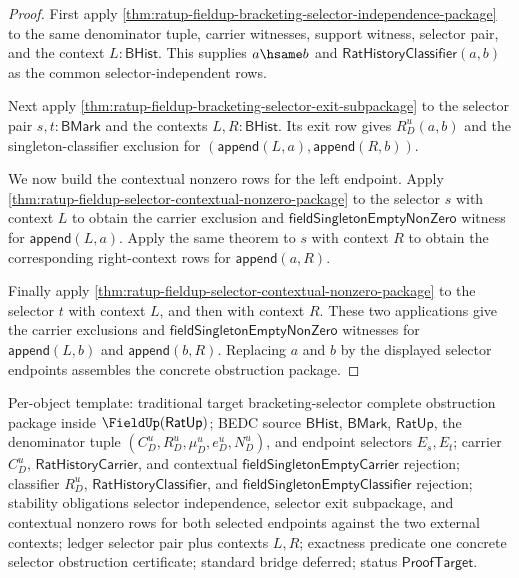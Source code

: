 \begin{proof}
First apply
\autoref{thm:ratup-fieldup-bracketing-selector-independence-package} to the
same denominator tuple, carrier witnesses, support witness, selector pair, and
the context $L:\mathsf{BHist}$. This supplies $a\hsame b$ and
$\mathsf{RatHistoryClassifier}(a,b)$ as the common selector-independent rows.

Next apply \autoref{thm:ratup-fieldup-bracketing-selector-exit-subpackage} to
the selector pair $s,t:\mathsf{BMark}$ and the contexts $L,R:\mathsf{BHist}$.
Its exit row gives $R_D^u(a,b)$ and the singleton-classifier exclusion for
$(\mathsf{append}(L,a),\mathsf{append}(R,b))$.

We now build the contextual nonzero rows for the left endpoint. Apply
\autoref{thm:ratup-fieldup-selector-contextual-nonzero-package} to the selector
$s$ with context $L$ to obtain the carrier exclusion and
$\mathsf{fieldSingletonEmptyNonZero}$ witness for $\mathsf{append}(L,a)$.
Apply the same theorem to $s$ with context $R$ to obtain the corresponding
right-context rows for $\mathsf{append}(a,R)$.

Finally apply
\autoref{thm:ratup-fieldup-selector-contextual-nonzero-package} to the selector
$t$ with context $L$, and then with context $R$. These two applications give the
carrier exclusions and $\mathsf{fieldSingletonEmptyNonZero}$ witnesses for
$\mathsf{append}(L,b)$ and $\mathsf{append}(b,R)$. Replacing $a$ and $b$ by the
displayed selector endpoints assembles the concrete obstruction package.
\end{proof}

Per-object template: traditional target bracketing-selector complete
obstruction package inside $\FieldUp(\mathsf{RatUp})$; BEDC source
$\mathsf{BHist}$, $\mathsf{BMark}$, $\mathsf{RatUp}$, the denominator tuple
$(C_D^u,R_D^u,\mu_D^u,e_D^u,N_D^u)$, and endpoint selectors $E_s,E_t$; carrier
$C_D^u$, $\mathsf{RatHistoryCarrier}$, and contextual
$\mathsf{fieldSingletonEmptyCarrier}$ rejection; classifier $R_D^u$,
$\mathsf{RatHistoryClassifier}$, and
$\mathsf{fieldSingletonEmptyClassifier}$ rejection; stability obligations
selector independence, selector exit subpackage, and contextual nonzero rows
for both selected endpoints against the two external contexts; ledger selector
pair plus contexts $L,R$; exactness predicate one concrete selector obstruction
certificate; standard bridge deferred; status $\mathsf{ProofTarget}$.
